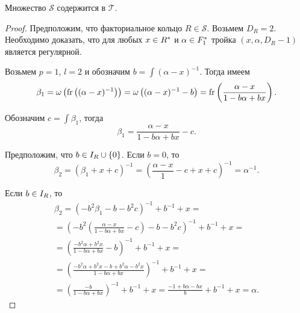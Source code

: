 \documentclass[_00_dissertation.tex]{subfiles}
\begin{document}
\begin{lemma}
    Множество $\mathcal{S}$ содержится в $\mathcal{T}$.
\end{lemma}
\begin{proof}
    Предположим, что факториальное кольцо $R \in \mathcal{S}$.
    Возьмем $D_R = 2$.
    Необходимо доказать, что для любых $x \in R^{*}$ и $\alpha \in F_1^{*}$ тройка $(x, \alpha, D_R - 1)$ является регулярной.
    
    Возьмем $p = 1$, $l = 2$ и обозначим $b = \int{(\alpha - x)^{-1}}$.
    Тогда имеем
    \begin{equation*}
        \beta_1 = \omega\left(
            \textrm{fr}\left((\alpha - x)^{-1}\right)
        \right) = \omega\left(
            (\alpha - x)^{-1} - b
        \right) = \textrm{fr}\left(\frac{\alpha - x}{1 - b\alpha + bx}\right).
    \end{equation*}

    Обозначим $c = \int{\beta_1}$, тогда
    \begin{equation*}
        \beta_1 = \frac{\alpha - x}{1 - b\alpha + bx} - c.
    \end{equation*}

    Предположим, что $b \in I_{R} \cup \{0\}$.
    Если $b = 0$, то
    \begin{equation*}
        \beta_2 = \left(
            \beta_1 + x + c
        \right)^{-1} =
        \left(
            \frac{\alpha - x}{1} - c + x + c
        \right)^{-1} = \alpha^{-1}.
    \end{equation*}

    Если $b \in I_{R}$, то
    \begin{equation*}
        \begin{split}
            \beta_2 = \left(
                -b^2 \beta_1 - b - b^2 c
            \right)^{-1} + b^{-1} + x = \\
            = \left(
                -b^2 \left(
                    \frac{\alpha - x}{1 - b\alpha + bx} - c
                \right) - b - b^2 c
            \right)^{-1} + b^{-1} + x = \\
            = \left(
                \frac{-b^2\alpha + b^2x}{1 - b\alpha + bx} - b
            \right)^{-1} + b^{-1} + x = \\
            = \left(
                \frac{-b^2\alpha + b^2x - b + b^2\alpha - b^2x}{1 - b\alpha + bx}
            \right)^{-1} + b^{-1} + x = \\
            = \left(
                \frac{- b}{1 - b\alpha + bx}
            \right)^{-1} + b^{-1} + x = \frac{-1 + b\alpha - bx}{b} + b^{-1} + x = \alpha.
        \end{split}
    \end{equation*}
    

\end{proof}
\end{document}
